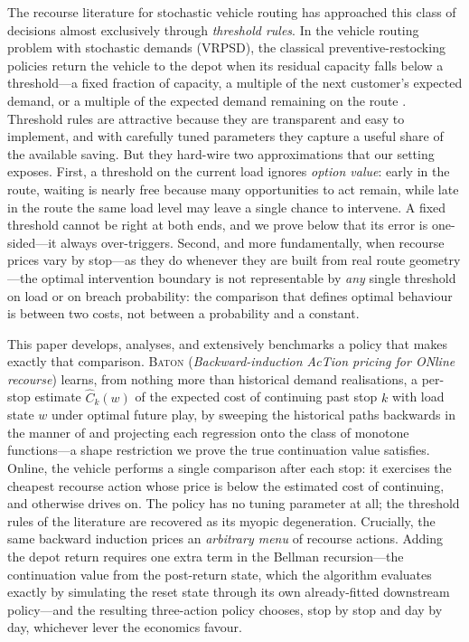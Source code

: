 \documentclass[preprint,authoryear,12pt]{elsarticle}
\theoremstyle{definition}
\theoremstyle{remark}
\begin{document}
The recourse literature for stochastic vehicle routing has approached
this class of decisions almost exclusively through \emph{threshold
rules}. In the vehicle routing problem with stochastic demands (VRPSD),
the classical preventive-restocking policies return the vehicle to the
depot when its residual capacity falls below a threshold---a fixed
fraction of capacity, a multiple of the next customer's expected demand,
or a multiple of the expected demand remaining on the route
\citep{yang2000stochastic,salavati2019rule}. Threshold rules are
attractive because they are transparent and easy to implement, and with
carefully tuned parameters they capture a useful share of the available
saving. But they hard-wire two approximations that our setting exposes.
First, a threshold on the current load ignores \emph{option value}: early
in the route, waiting is nearly free because many opportunities to act
remain, while late in the route the same load level may leave a single
chance to intervene. A fixed threshold cannot be right at both ends, and
we prove below that its error is one-sided---it always over-triggers.
Second, and more fundamentally, when recourse prices vary by stop---as
they do whenever they are built from real route geometry---the optimal
intervention boundary is not representable by \emph{any} single threshold
on load or on breach probability: the comparison that defines optimal
behaviour is between two costs, not between a probability and a constant.

This paper develops, analyses, and extensively benchmarks a policy that
makes exactly that comparison. \textsc{Baton} (\emph{Backward-induction
AcTion pricing for ONline recourse}) learns, from nothing more than
historical demand realisations, a per-stop estimate
$\widehat C_k(w)$ of the expected cost of continuing past stop $k$ with
load state $w$ under optimal future play, by sweeping the historical
paths backwards in the manner of \citet{longstaff2001valuing} and
projecting each regression onto the class of monotone functions---a
shape restriction we prove the true continuation value satisfies. Online,
the vehicle performs a single comparison after each stop: it exercises
the cheapest recourse action whose price is below the estimated cost of
continuing, and otherwise drives on. The policy has no tuning parameter
at all; the threshold rules of the literature are recovered as its
myopic degeneration. Crucially, the same backward induction prices an
\emph{arbitrary menu} of recourse actions. Adding the depot return
requires one extra term in the Bellman recursion---the continuation
value from the post-return state, which the algorithm evaluates exactly
by simulating the reset state through its own already-fitted downstream
policy---and the resulting three-action policy chooses, stop by stop and
day by day, whichever lever the economics favour.
\end{document}
